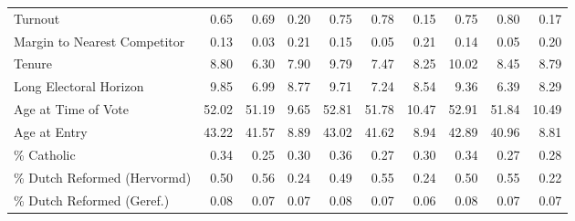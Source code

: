 \begin{table}
\begin{tabular}[t]{lrrrrrrrrr}
Turnout & \num{0.65} & \num{0.69} & \num{0.20} & \num{0.75} & \num{0.78} & \num{0.15} & \num{0.75} & \num{0.80} & \num{0.17}\\
Margin to Nearest Competitor & \num{0.13} & \num{0.03} & \num{0.21} & \num{0.15} & \num{0.05} & \num{0.21} & \num{0.14} & \num{0.05} & \num{0.20}\\
Tenure & \num{8.80} & \num{6.30} & \num{7.90} & \num{9.79} & \num{7.47} & \num{8.25} & \num{10.02} & \num{8.45} & \num{8.79}\\
Long Electoral Horizon & \num{9.85} & \num{6.99} & \num{8.77} & \num{9.71} & \num{7.24} & \num{8.54} & \num{9.36} & \num{6.39} & \num{8.29}\\
Age at Time of Vote & \num{52.02} & \num{51.19} & \num{9.65} & \num{52.81} & \num{51.78} & \num{10.47} & \num{52.91} & \num{51.84} & \num{10.49}\\
Age at Entry & \num{43.22} & \num{41.57} & \num{8.89} & \num{43.02} & \num{41.62} & \num{8.94} & \num{42.89} & \num{40.96} & \num{8.81}\\
\% Catholic & \num{0.34} & \num{0.25} & \num{0.30} & \num{0.36} & \num{0.27} & \num{0.30} & \num{0.34} & \num{0.27} & \num{0.28}\\
\% Dutch Reformed (Hervormd) & \num{0.50} & \num{0.56} & \num{0.24} & \num{0.49} & \num{0.55} & \num{0.24} & \num{0.50} & \num{0.55} & \num{0.22}\\
\% Dutch Reformed (Geref.) & \num{0.08} & \num{0.07} & \num{0.07} & \num{0.08} & \num{0.07} & \num{0.06} & \num{0.08} & \num{0.07} & \num{0.07}\\
\bottomrule
\end{tabular}
\end{table}
